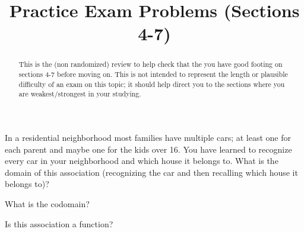 \documentclass{ximera}
\title{Practice Exam Problems (Sections 4-7)}
\begin{document}
\begin{abstract}
    This is the (non randomized) review to help check that the you have good footing on sections 4-7 before moving on. This is not intended to represent the length or plausible difficulty of an exam on this topic; it should help direct you to the sections where you are weakest/strongest in your studying.
\end{abstract}

\maketitle




\begin{problem}
    In a residential neighborhood most families have multiple cars; at least one for each parent and maybe one for the kids over 16. You have learned to recognize every car in your neighborhood and which house it belongs to. What is the domain of this association (recognizing the car and then recalling which house it belongs to)?
    \begin{multipleChoice}
    \end{multipleChoice}
    \begin{problem}
        What is the codomain?
        \begin{multipleChoice}
        \end{multipleChoice}
        \begin{problem}
            Is this association a function?
            \begin{multipleChoice}
            \end{multipleChoice}
        \end{problem}
    \end{problem}
\end{problem}
\end{document}
